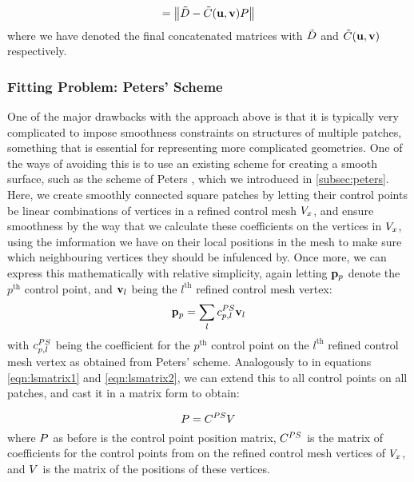 \begin{equation}
\label{eq:lsconcatmat}
= \norm{\lsDataPointConcMatrix - \lsControlCoefConcMatrix(\vec{u},\vec{v}) \lsControlPointMatrix }
\end{equation}
where we have denoted the final concatenated matrices with $\lsDataPointConcMatrix$ and $ \lsControlCoefConcMatrix(\vec{u},\vec{v})$ respectively.

\subsubsection{Fitting Problem: Peters' Scheme}
\label{subsub:petersleastsq}
One of the major drawbacks with the approach above is that it is typically very complicated to impose smoothness constraints on structures of multiple patches, something that is essential for representing more complicated geometries. One of the ways of avoiding this is to use an existing scheme for creating a smooth surface, such as the scheme of Peters \cite{peters1992constructing,eck1996automatic}, which we introduced in \autoref{subsec:peters}. Here, we create smoothly connected square \Bez patches by letting their control points be linear combinations of vertices in a refined control mesh $\petersPatchPoints$, and ensure smoothness by the way that we calculate these coefficients on the vertices in $\petersPatchPoints$, using the imformation we have on their local positions in the mesh to make sure which neighbouring vertices they should be infulenced by. Once more, we can express this mathematically with relative simplicity, again letting $\lsControlPointi{p}$ denote the $p^\text{th}$ control point, and $\petersPatchPointVec_l$ being the $l^\text{th}$ refined control mesh vertex:
\begin{equation}
\lsControlPointi{p} = \sum\limits_{l} \petersControlPointCoef_{p,l} \petersPatchPointVec_l
\end{equation} 
with $\petersControlPointCoef_{p,l}$ being the coefficient for the $p^\text{th}$ \Bez control point on the $l^\text{th}$ refined control mesh vertex as obtained from Peters' scheme. Analogously to in equations \ref{eqn:lsmatrix1} and \ref{eqn:lsmatrix2}, we can extend this to all \Bez control points on all patches, and cast it in a matrix form to obtain:

\begin{equation}
\lsControlPointMatrix = \petersControlPointCoefMatrix\petersPatchPointMatrix
\end{equation}
where $\lsControlPointMatrix$ as before is the \Bez control point position matrix, $\petersControlPointCoefMatrix$ is the matrix of coefficients for the \Bez control points from on the refined control mesh vertices of $\petersPatchPoints$, and $\petersPatchPointMatrix$ is the matrix of the positions of these vertices. 

